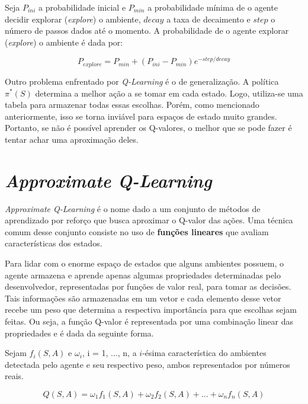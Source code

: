 Seja $P_{ini}$ a probabilidade inicial e $P_{min}$ a probabilidade mínima de o agente decidir explorar (\textit{explore}) o ambiente, $decay$ a taxa de decaimento e $step$ o número de passos dados até o momento.
A probabilidade de o agente explorar (\textit{explore}) o ambiente é dada por:

\begin{equation} \label{eq:exp_exp_prob}
P_{explore} = P_{min} + (P_{ini} - P_{min})e^{-step/decay}
\end{equation}

Outro problema enfrentado por \textit{Q-Learning} é o de generalização.
A política $\pi^{*}(S)$ determina a melhor ação a se tomar em cada estado.
Logo, utiliza-se uma tabela para armazenar todas essas escolhas.
Porém, como mencionado anteriormente, isso se torna inviável para espaços de estado muito grandes.
Portanto, se não é possível aprender os Q-valores, o melhor que se pode fazer é tentar achar uma aproximação deles.


\section{\textit{Approximate Q-Learning}}
\label{sec:aql}

\textit{Approximate Q-Learning} é o nome dado a um conjunto de métodos de aprendizado por reforço que busca aproximar o Q-valor das ações.
Uma técnica comum desse conjunto consiste no uso de \textbf{funções lineares} que avaliam características dos estados.

Para lidar com o enorme espaço de estados que alguns ambientes possuem, o agente armazena e aprende apenas algumas propriedades determinadas pelo desenvolvedor, representadas por funções de valor real, para tomar as decisões.
Tais informações são armazenadas em um vetor e cada elemento desse vetor recebe um peso que determina a respectiva importância para que escolhas sejam feitas. Ou seja, a função Q-valor é representada por uma combinação linear das propriedades e é dada da seguinte forma.

Sejam $f_{i}(S,A)$ e $\omega_{i}$, i = 1, ..., n, a $i$-ésima característica do ambientes detectada pelo agente e seu respectivo peso, ambos representados por números reais.

\begin{equation} \label{eq:q_lin_comb}
Q(S,A) = \omega_{1}f_{1}(S,A) + \omega_{2}f_{2}(S,A) + ... + \omega_{n}f_{n}(S,A)
\end{equation}

